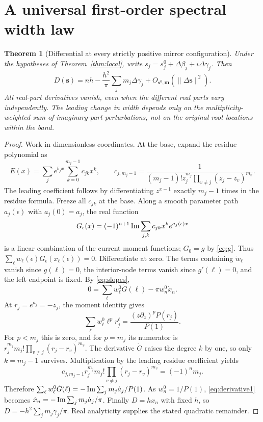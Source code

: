 \documentclass[11pt]{article}
\newtheorem{theorem}{Theorem}[section]
\theoremstyle{remark}\newtheorem{remark}[theorem]{Remark}
\begin{document}
\section{A universal first-order spectral width law}
\begin{theorem}[Differential at every strictly positive mirror configuration]\label{thm:differential}
Under the hypotheses of Theorem~\ref{thm:local}, write $s_j=s_j^0+\Delta\beta_j+i\Delta\gamma_j$. Then
\begin{equation}\label{eq:diff}
 D(\boldsymbol{s})=nh-\frac{h^2}{\pi}\sum_jm_j\Delta\gamma_j+O_{\boldsymbol{s}^0,\boldsymbol m}(\|\Delta\boldsymbol{s}\|^2).
\end{equation}
All real-part derivatives vanish, even when the different real parts vary independently. The leading change in width depends only on the multiplicity-weighted sum of imaginary-part perturbations, not on the original root locations within the band.
\end{theorem}
\begin{proof}
Work in dimensionless coordinates. At the base, expand the residue polynomial as
\[
 E(x)=\sum_j e^{b_jx}\sum_{k=0}^{m_j-1}c_{jk}x^k,
 \qquad c_{j,m_j-1}=\frac{1}{(m_j-1)!z_j^{m_j}\prod_{v\ne j}(z_j-z_v)^{m_v}}.
\]
The leading coefficient follows by differentiating $z^{x-1}$ exactly $m_j-1$ times in the residue formula. Freeze all $c_{jk}$ at the base. Along a smooth parameter path $a_j(\epsilon)$ with $a_j(0)=a_j$, the real function
\[
 G_\epsilon(x)=(-1)^{n+1}\operatorname{Im}\sum_{j,k}c_{jk}x^k e^{a_j(\epsilon)x}
\]
is a linear combination of the current moment functions; $G_0=g$ by \eqref{eq:g}. Thus $\sum_\ell w_\ell(\epsilon)G_\epsilon(x_\ell(\epsilon))=0$. Differentiate at zero. The terms containing $\dot w_\ell$ vanish since $g(\ell)=0$, the interior-node terms vanish since $g'(\ell)=0$, and the left endpoint is fixed. By \eqref{eq:slopes},
\begin{equation}\label{eq:derivative1}
 0=\sum_\ell w_\ell^0\dot G(\ell)-\pi w_n^0\dot x_n.
\end{equation}
At $r_j=e^{a_j}=-z_j$, the moment identity gives
\[
 \sum_\ell w_\ell^0 \ell^p r_j^\ell
 =\frac{(z\partial_z)^pP(r_j)}{P(1)}.
\]
For $p<m_j$ this is zero, and for $p=m_j$ its numerator is $r_j^{m_j}m_j!\prod_{v\ne j}(r_j-r_v)^{m_v}$. The derivative $\dot G$ raises the degree $k$ by one, so only $k=m_j-1$ survives. Multiplication by the leading residue coefficient yields
\[
 c_{j,m_j-1}r_j^{m_j}m_j!\prod_{v\ne j}(r_j-r_v)^{m_v}=(-1)^n m_j.
\]
Therefore $\sum_\ell w_\ell^0\dot G(\ell)=-\operatorname{Im}\sum_jm_j\dot a_j/P(1)$. As $w_n^0=1/P(1)$, \eqref{eq:derivative1} becomes $\dot x_n=-\operatorname{Im}\sum_jm_j\dot a_j/\pi$. Finally $D=h x_n$ with fixed $h$, so $\dot D=-h^2\sum_jm_j\dot\gamma_j/\pi$. Real analyticity supplies the stated quadratic remainder.
\end{proof}
\end{document}
